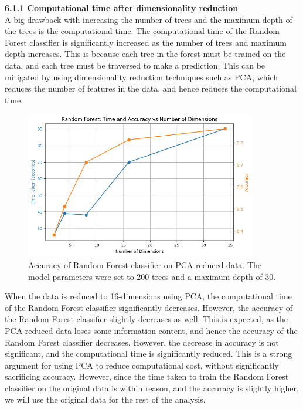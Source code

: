 \documentclass[12pt]{article}
\begin{document}
\vspace{20pt}

\textbf{6.1.1 Computational time after dimensionality reduction}
\\
A big drawback with increasing the number of trees and the maximum depth of the trees is the computational time. The computational time of the Random Forest classifier is significantly increased as the number of trees and maximum depth increases. This is because each tree in the forest must be trained on the data, and each tree must be traversed to make a prediction. This can be mitigated by using dimensionality reduction techniques such as PCA, which reduces the number of features in the data, and hence reduces the computational time.

\begin{figure}[H]
\centering
\includegraphics[width=0.9\textwidth]{figures/rf_accuracy_pca.png}
\caption{Accuracy of Random Forest classifier on PCA-reduced data. The model parameters were set to 200 trees and a maximum depth of 30.}
\label{fig:rf_accuracy_pca}
\end{figure}

When the data is reduced to 16-dimensions using PCA, the computational time of the Random Forest classifier significantly decreases. However, the accuracy of the Random Forest classifier slightly decreases as well. This is expected, as the PCA-reduced data loses some information content, and hence the accuracy of the Random Forest classifier decreases. However, the decrease in accuracy is not significant, and the computational time is significantly reduced. This is a strong argument for using PCA to reduce computational cost, without significantly sacrificing accuracy. However, since the time taken to train the Random Forest classifier on the original data is within reason, and the accuracy is slightly higher, we will use the original data for the rest of the analysis.
\end{document}
